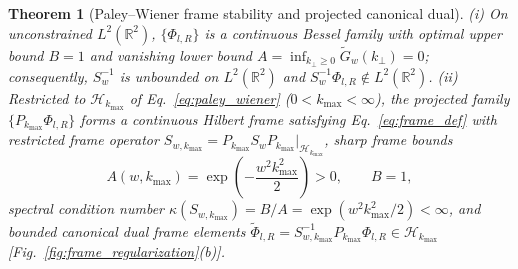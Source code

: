 \documentclass[aps,pra,onecolumn,notitlepage,11pt,tightenlines,nofootinbib,floatfix,longbibliography]{revtex4-2}
\newtheorem{theorem}{Theorem}
\theoremstyle{remark}
\begin{document}
\begin{theorem}[Paley--Wiener frame stability and projected canonical dual]
\label{thm:pw_bounds}
(i) On unconstrained $L^2(\mathbb{R}^2)$, $\{\Phi_{l,R}\}$ is a continuous Bessel family with optimal upper bound $B = 1$ and vanishing lower bound $A = \inf_{k_\perp \ge 0}\widetilde{G}_w(k_\perp) = 0$; consequently, $S_w^{-1}$ is unbounded on $L^2(\mathbb{R}^2)$ and $S_w^{-1}\Phi_{l,R} \notin L^2(\mathbb{R}^2)$. (ii) Restricted to $\mathcal{H}_{k_{\max}}$ of Eq.~\eqref{eq:paley_wiener} ($0 < k_{\max} < \infty$), the projected family $\{P_{k_{\max}}\Phi_{l,R}\}$ forms a continuous Hilbert frame satisfying Eq.~\eqref{eq:frame_def} with restricted frame operator $S_{w,k_{\max}} = P_{k_{\max}} S_w P_{k_{\max}}\big|_{\mathcal{H}_{k_{\max}}}$, sharp frame bounds
\begin{equation}
A(w,k_{\max}) = \exp\!\left(-\frac{w^2 k_{\max}^2}{2}\right) > 0, \qquad B = 1,
\label{eq:pw_bounds}
\end{equation}
spectral condition number $\kappa(S_{w,k_{\max}}) = B/A = \exp(w^2 k_{\max}^2/2) < \infty$, and bounded canonical dual frame elements $\widetilde{\Phi}_{l,R} = S_{w,k_{\max}}^{-1}P_{k_{\max}}\Phi_{l,R} \in \mathcal{H}_{k_{\max}}$ [Fig.~\ref{fig:frame_regularization}(b)].
\end{theorem}
\end{document}
